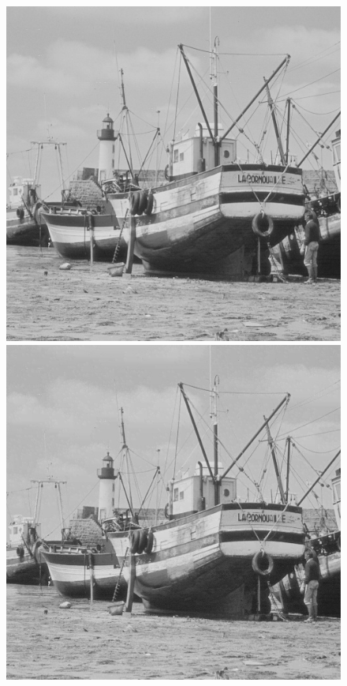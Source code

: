 \documentclass[12pt]{report}
\begin{document}
\begin{figure}[H]
\begin{center}
\includegraphics[scale=0.25]{../ImageRes/ImagedecodeeMICDbiQ2.jpg} 
\includegraphics[scale=0.25]{../ImageRes/ImagedecodeeMICDbiQ8.jpg} 

\end{center}
\end{figure}
\end{document}
